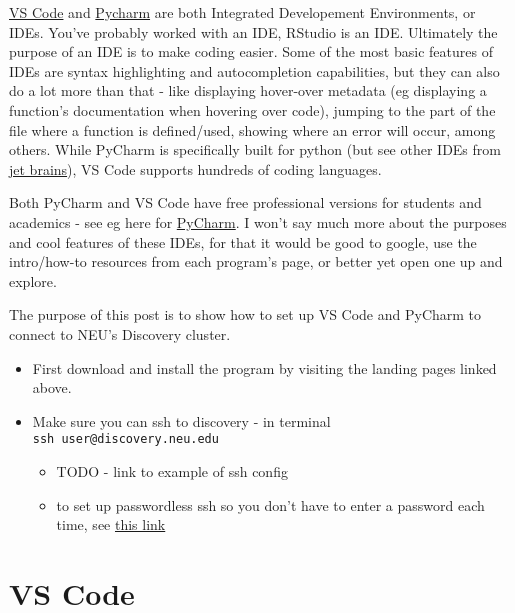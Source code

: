 \documentclass[
  letterpaper,
  DIV=11,
  numbers=noendperiod]{scrreprt}
\begin{document}
\href{https://code.visualstudio.com/}{VS Code} and
\href{https://www.jetbrains.com/pycharm/}{Pycharm} are both Integrated
Developement Environments, or IDEs. You've probably worked with an IDE,
RStudio is an IDE. Ultimately the purpose of an IDE is to make coding
easier. Some of the most basic features of IDEs are syntax highlighting
and autocompletion capabilities, but they can also do a lot more than
that - like displaying hover-over metadata (eg displaying a function's
documentation when hovering over code), jumping to the part of the file
where a function is defined/used, showing where an error will occur,
among others. While PyCharm is specifically built for python (but see
other IDEs from \href{https://www.jetbrains.com/}{jet brains}), VS Code
supports hundreds of coding languages.

Both PyCharm and VS Code have free professional versions for students
and academics - see eg here for
\href{https://www.jetbrains.com/community/education/\#students}{PyCharm}.
I won't say much more about the purposes and cool features of these
IDEs, for that it would be good to google, use the intro/how-to
resources from each program's page, or better yet open one up and
explore.

The purpose of this post is to show how to set up VS Code and PyCharm to
connect to NEU's Discovery cluster.

\begin{itemize}
\item
  First download and install the program by visiting the landing pages
  linked above.
\item
  Make sure you can ssh to discovery - in terminal
  \texttt{ssh\ user@discovery.neu.edu}

  \begin{itemize}
  \item
    TODO - link to example of ssh config
  \item
    to set up passwordless ssh so you don't have to enter a password
    each time, see \href{http://www.linuxproblem.org/art_9.html}{this
    link}
  \end{itemize}
\end{itemize}

\hypertarget{vs-code}{%
\section*{\texorpdfstring{\textbf{VS Code}}{VS Code}}\label{vs-code}}
\end{document}
